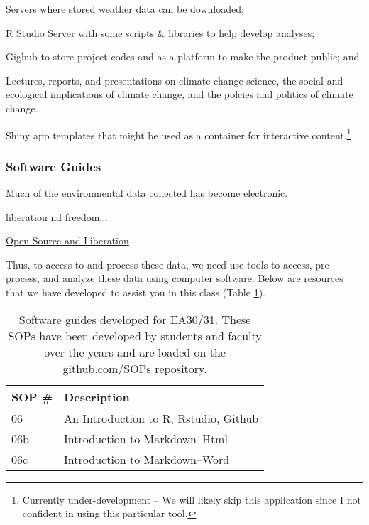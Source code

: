 \documentclass{article}\usepackage[]{graphicx}\usepackage[]{color}
\newenvironment{itemize*}%
  {\begin{itemize}%
    \setlength{\itemsep}{0pt}%
    \setlength{\parskip}{0pt}}%
  {\end{itemize}}
\begin{document}
\begin{itemize*}
  \item Servers where stored weather data can be downloaded;
  \item R Studio Server with some scripts \& libraries to help develop analyses;
  \item Gighub to store project codes and as a platform to make the product public; and
  \item Lectures, reports, and presentations on climate change science, the social and ecological implications of climate change, and the polcies and politics of climate change. 
  \item Shiny app templates that might be used as a container for interactive content.\footnote{Currently under-development -- We will likely skip this application since I not confident in using this particular tool.}
\end{itemize*}

\subsubsection{Software Guides}

Much of the environmental data collected has become electronic. 

liberation nd freedom...

\href{https://github.com/marclos/Climate_Change_Narratives/raw/master/Admin/Liberation_via_Open_Source_Software.pdf}{Open Source and Liberation}


Thus, to access to and process these data, we need use tools to access, pre-process, and analyze these data using computer software. Below are resources that we have developed to assist you in this class (Table \ref{tab:softwareguides}).

\begin{table}[h]
\caption{Software guides developed for EA30/31. These SOPs have been developed by students and faculty over the years and are loaded on the github.com/SOPs repository.}\label{tab:softwareguides}
\centering
\begin{tabular}{ll}\hline
SOP \#    & Description                                 \\\hline\hline
06        & An Introduction to R, Rstudio, Github       \\
06b       & Introduction to Markdown--Html              \\
06c       & Introduction to Markdown--Word              \\
\hline
\end{tabular}
\end{table}
\end{document}
